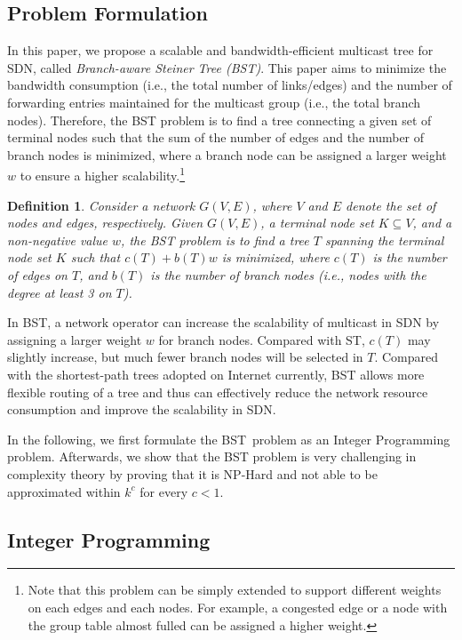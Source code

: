 \documentclass[conference]{IEEEtran}
\newtheorem{definition}{Definition}
\begin{document}
\subsection{Problem Formulation}

In this paper, we propose a scalable and bandwidth-efficient multicast tree
for SDN, called \textit{Branch-aware Steiner Tree (BST)}. This paper aims to
minimize the bandwidth consumption (i.e., the total number of links/edges)
and the number of forwarding entries maintained for the multicast group
(i.e., the total branch nodes). Therefore, the BST problem is to find a tree
connecting a given set of terminal nodes such that the sum of the number of
edges and the number of branch nodes is minimized, where a branch node can
be assigned a larger weight $w$ to ensure a higher scalability.\footnote{Note that this problem can be simply extended to support different weights
on each edges and each nodes. For example, a congested edge or a node with
the group table almost fulled can be assigned a higher weight.}

\begin{definition}
Consider a network $G(V,E)$, where $V$ and $E$ denote the set of nodes and
edges, respectively. Given $G(V,E)$, a terminal node set $K\subseteq V$, and
a non-negative value $w$, the BST problem is to find a tree $T$ spanning the
terminal node set $K$ such that $c(T)+b(T)w$ is minimized, where $c(T)$ is
the number of edges on $T$, and $b(T)$ is
the number of branch nodes (i.e., nodes with the degree at least 3 on $T$).
\end{definition}

In BST, a network operator can increase the scalability of multicast in SDN by
assigning a larger weight $w$ for branch nodes. Compared with ST, $c(T)$ may
slightly increase, but much fewer branch nodes will be selected in $T$.
Compared with the shortest-path trees adopted on Internet currently, BST
allows more flexible routing of a tree and thus can effectively reduce the
network resource consumption and improve the scalability in SDN.

In the following, we first formulate the BST\ problem as an Integer
Programming problem. Afterwards, we show that the BST problem is very
challenging in complexity theory by proving that it is NP-Hard and not able
to be approximated within $k^{c}$ for every $c<1$.

\subsection{Integer Programming}
\label{subsec:integer_programming}
\end{document}

